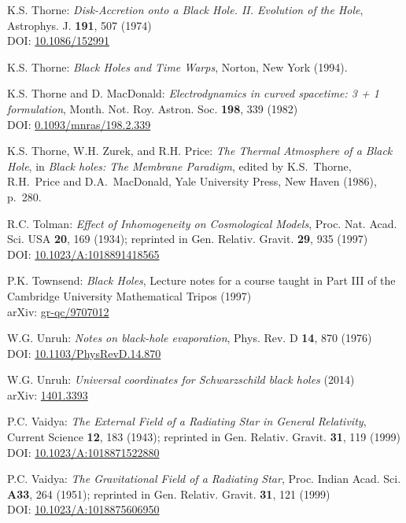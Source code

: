\begin{thebibliography}{123}
K.S. Thorne:
{\em Disk-Accretion onto a Black Hole. II. Evolution of the Hole},
Astrophys. J. {\bf 191}, 507 (1974)\\
DOI: \href{https://doi.org/10.1086/152991}{10.1086/152991}

K.S. Thorne:
{\em Black Holes and Time Warps},
Norton, New York (1994).

K.S. Thorne and D. MacDonald:
{\em Electrodynamics in curved spacetime: 3 + 1 formulation},
Month. Not. Roy. Astron. Soc. {\bf 198}, 339 (1982)\\
DOI: \href{https://doi.org/10.1093/mnras/198.2.339}{0.1093/mnras/198.2.339}

K.S. Thorne, W.H. Zurek, and R.H. Price:
{\em The Thermal Atmosphere of a Black Hole},
in {\em Black holes: The Membrane Paradigm},
edited by  K.S.~Thorne, R.H.~Price and D.A.~MacDonald,
Yale University Press, New Haven (1986), p.~280.

R.C. Tolman:
{\em Effect of Inhomogeneity on Cosmological Models},
Proc. Nat. Acad. Sci. USA {\bf 20}, 169 (1934);
reprinted in Gen. Relativ. Gravit. {\bf 29}, 935 (1997)\\
DOI: \href{https://doi.org/10.1023/A:1018891418565}{10.1023/A:1018891418565}

P.K. Townsend: {\em Black Holes}, Lecture notes for a course taught in Part III
of the Cambridge University Mathematical Tripos (1997)\\
arXiv: \href{https://arxiv.org/abs/gr-qc/9707012}{gr-qc/9707012}

W.G. Unruh: {\em Notes on black-hole evaporation},
Phys. Rev. D {\bf 14}, 870 (1976)\\
DOI: \href{https://doi.org/10.1103/PhysRevD.14.870}{10.1103/PhysRevD.14.870}

W.G. Unruh: {\em Universal coordinates for Schwarzschild black holes} (2014)\\
arXiv: \href{https://arxiv.org/abs/1401.3393}{1401.3393}

P.C. Vaidya:
{\em The External Field of a Radiating Star in General Relativity},
Current Science {\bf 12}, 183 (1943);
reprinted in Gen. Relativ. Gravit. {\bf 31}, 119 (1999)\\
DOI: \href{https://doi.org/10.1023/A:1018871522880}{10.1023/A:1018871522880}

P.C. Vaidya:
{\em The Gravitational Field of a Radiating Star},
Proc. Indian Acad. Sci. {\bf A33}, 264 (1951);
reprinted in Gen. Relativ. Gravit. {\bf 31}, 121 (1999)\\
DOI: \href{https://doi.org/10.1023/A:1018875606950}{10.1023/A:1018875606950}


\end{thebibliography}
